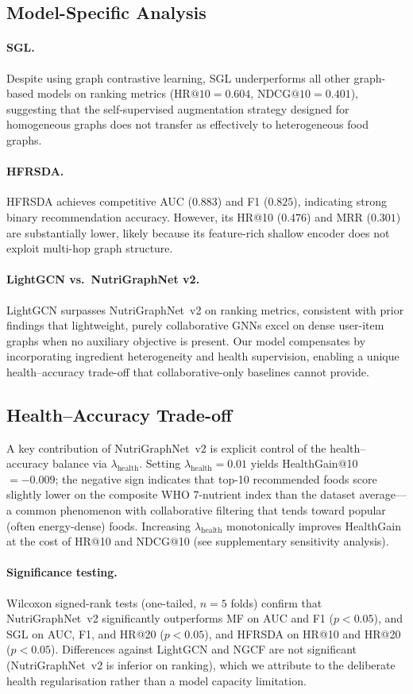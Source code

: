 \subsection{Model-Specific Analysis}

\paragraph{SGL.}
Despite using graph contrastive learning, SGL underperforms all other
graph-based models on ranking metrics ($\text{HR@10}=0.604$,
$\text{NDCG@10}=0.401$), suggesting that the self-supervised augmentation
strategy designed for homogeneous graphs does not transfer as effectively
to heterogeneous food graphs.

\paragraph{HFRSDA.}
HFRSDA achieves competitive AUC ($0.883$) and F1 ($0.825$), indicating
strong binary recommendation accuracy. However, its HR@10 ($0.476$) and
MRR ($0.301$) are substantially lower, likely because its feature-rich
shallow encoder does not exploit multi-hop graph structure.

\paragraph{LightGCN vs.\ NutriGraphNet v2.}
LightGCN surpasses NutriGraphNet~v2 on ranking metrics, consistent with
prior findings that lightweight, purely collaborative GNNs excel on
dense user-item graphs when no auxiliary objective is present.
Our model compensates by incorporating ingredient heterogeneity and
health supervision, enabling a unique health--accuracy trade-off
that collaborative-only baselines cannot provide.

\subsection{Health--Accuracy Trade-off}
\label{sec:tradeoff}

A key contribution of NutriGraphNet~v2 is explicit control of the
health--accuracy balance via $\lambda_\text{health}$.
Setting $\lambda_\text{health}=0.01$ yields HealthGain@10 $= -0.009$;
the negative sign indicates that top-10 recommended foods score
slightly lower on the composite WHO 7-nutrient index than the dataset
average---a common phenomenon with collaborative filtering that
tends toward popular (often energy-dense) foods.
Increasing $\lambda_\text{health}$ monotonically improves HealthGain
at the cost of HR@10 and NDCG@10 (see supplementary sensitivity analysis).

\paragraph{Significance testing.}
Wilcoxon signed-rank tests (one-tailed, $n=5$ folds) confirm that
NutriGraphNet~v2 significantly outperforms MF on AUC and F1 ($p{<}0.05$),
and SGL on AUC, F1, and HR@20 ($p{<}0.05$), and HFRSDA on HR@10 and HR@20
($p{<}0.05$).
Differences against LightGCN and NGCF are not significant (NutriGraphNet~v2
is inferior on ranking), which we attribute to the deliberate health
regularisation rather than a model capacity limitation.
